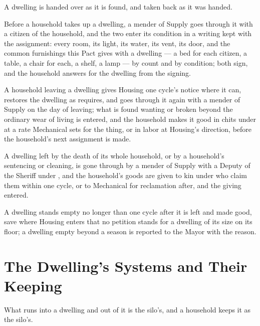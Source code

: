 A dwelling is handed over as it is found, and taken back as it was handed.

\begin{clauses}
\item Before a household takes up a dwelling, a mender of Supply goes through it with a citizen of the household, and the two enter its condition in a writing kept with the assignment: every room, its light, its water, its vent, its door, and the common furnishings this Pact gives with a dwelling --- a bed for each citizen, a table, a chair for each, a shelf, a lamp --- by count and by condition; both sign, and the household answers for the dwelling from the signing.
\item A household leaving a dwelling gives Housing one cycle's notice where it can, restores the dwelling as  requires, and goes through it again with a mender of Supply on the day of leaving; what is found wanting or broken beyond the ordinary wear of living is entered, and the household makes it good in chits under  at a rate Mechanical sets for the thing, or in labor at Housing's direction, before the household's next assignment is made.
\item A dwelling left by the death of its whole household, or by a household's sentencing or cleaning, is gone through by a mender of Supply with a Deputy of the Sheriff under , and the household's goods are given to kin under  who claim them within one cycle, or to Mechanical for reclamation after, and the giving entered.
\item A dwelling stands empty no longer than one cycle after it is left and made good, save where Housing enters that no petition stands for a dwelling of its size on its floor; a dwelling empty beyond a season is reported to the Mayor with the reason.
\end{clauses}

\section{The Dwelling's Systems and Their Keeping}
\label{sec:housing:dwellings-systems-and-their-keeping}

What runs into a dwelling and out of it is the silo's, and a household keeps it as the silo's.

